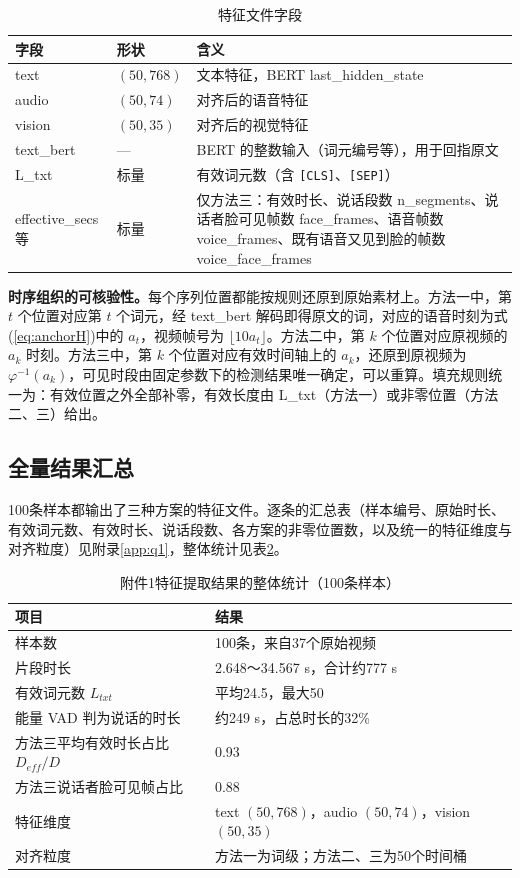 \begin{table}[htbp]
\centering
\caption{特征文件字段}
\label{tab:q1npz}
\begin{tabularx}{\textwidth}{ll>{\raggedright\arraybackslash}X}
\toprule
字段 & 形状 & 含义 \\
\midrule
text & $(50,768)$ & 文本特征，BERT last\_hidden\_state \\
audio & $(50,74)$ & 对齐后的语音特征 \\
vision & $(50,35)$ & 对齐后的视觉特征 \\
text\_bert & — & BERT 的整数输入（词元编号等），用于回指原文 \\
L\_txt & 标量 & 有效词元数（含 \texttt{[CLS]}、\texttt{[SEP]}） \\
effective\_secs 等 & 标量 & 仅方法三：有效时长、说话段数 n\_segments、说话者脸可见帧数 face\_frames、语音帧数 voice\_frames、既有语音又见到脸的帧数 voice\_face\_frames \\
\bottomrule
\end{tabularx}
\end{table}

\textbf{时序组织的可核验性。}每个序列位置都能按规则还原到原始素材上。方法一中，第 $t$ 个位置对应第 $t$ 个词元，经 text\_bert 解码即得原文的词，对应的语音时刻为式(\ref{eq:anchorH})中的 $a_t$，视频帧号为 $\lfloor10a_t\rfloor$。方法二中，第 $k$ 个位置对应原视频的 $a_k$ 时刻。方法三中，第 $k$ 个位置对应有效时间轴上的 $a_k$，还原到原视频为 $\varphi^{-1}(a_k)$，可见时段由固定参数下的检测结果唯一确定，可以重算。填充规则统一为：有效位置之外全部补零，有效长度由 L\_txt（方法一）或非零位置（方法二、三）给出。

\subsection{全量结果汇总}\label{sec:q1res}

100条样本都输出了三种方案的特征文件。逐条的汇总表（样本编号、原始时长、有效词元数、有效时长、说话段数、各方案的非零位置数，以及统一的特征维度与对齐粒度）见附录\ref{app:q1}，整体统计见表\ref{tab:q1sum}。

\begin{table}[htbp]
\centering
\caption{附件1特征提取结果的整体统计（100条样本）}
\label{tab:q1sum}
\begin{tabular}{ll}
\toprule
项目 & 结果 \\
\midrule
样本数 & 100条，来自37个原始视频 \\
片段时长 & 2.648～34.567 s，合计约777 s \\
有效词元数 $L_{txt}$ & 平均24.5，最大50 \\
能量 VAD 判为说话的时长 & 约249 s，占总时长的32\% \\
方法三平均有效时长占比 $D_{eff}/D$ & 0.93 \\
方法三说话者脸可见帧占比 & 0.88 \\
特征维度 & text $(50,768)$，audio $(50,74)$，vision $(50,35)$ \\
对齐粒度 & 方法一为词级；方法二、三为50个时间桶 \\
\bottomrule
\end{tabular}
\end{table}

